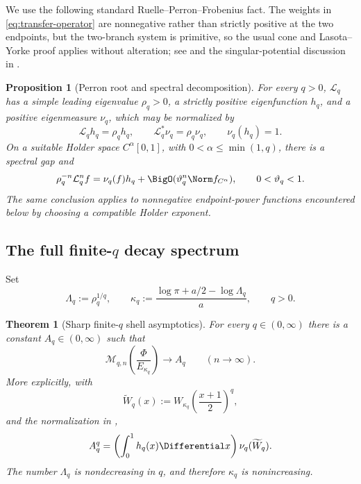 \documentclass[11pt,oneside]{article}
\newtheorem{theorem}{Theorem}[section]
\newtheorem{proposition}[proposition]{Proposition}
\theoremstyle{definition}
\theoremstyle{remark}
\newcommand{\Phiup}{\Phi}
\begin{document}
We use the following standard Ruelle--Perron--Frobenius fact.  The weights in
\eqref{eq:transfer-operator} are nonnegative rather than strictly positive at the two
endpoints, but the two-branch system is primitive, so the usual cone and
Lasota--Yorke proof applies without alteration; see \cite[Chs.~2--3]{baladi} and the
singular-potential discussion in \cite{fan1997,fan-schmeling-shen}.

\begin{proposition}[Perron root and spectral decomposition]
\label{prop:RPF}
For every $q>0$, $\mathcal L_q$ has a simple leading eigenvalue
$\rho_q>0$, a strictly positive eigenfunction $h_q$, and a positive eigenmeasure $\nu_q$,
which may be normalized by
\[
 \mathcal L_qh_q=\rho_qh_q,
 \qquad
 \mathcal L_q^*\nu_q=\rho_q\nu_q,
 \qquad
 \nu_q(h_q)=1.
\]
On a suitable Holder space $C^\alpha[0,1]$, with
$0<\alpha\le\min(1,q)$, there is a spectral gap and
\begin{equation}
 \rho_q^{-n}\mathcal L_q^nf
 =\nu_q(f)h_q+\BigO(\vartheta_q^n\Norm f_{C^\alpha}),
 \qquad 0<\vartheta_q<1.
 \label{eq:RPF-convergence}
\end{equation}
The same conclusion applies to nonnegative endpoint-power functions encountered below by
choosing a compatible Holder exponent.
\end{proposition}

\subsection{The full finite-\texorpdfstring{$q$}{q} decay spectrum}

Set
\begin{equation}
 \Lambda_q:=\rho_q^{1/q},
 \qquad
 \kappa_q:=\frac{\log\pi+a/2-\log\Lambda_q}{a},
 \qquad q>0.
 \label{eq:kappa-q}
\end{equation}

\begin{theorem}[Sharp finite-$q$ shell asymptotics]
\label{thm:Lq-spectrum}
For every $q\in(0,\infty)$ there is a constant $A_q\in(0,\infty)$ such that
\begin{equation}
 \mathcal M_{q,n}\!\left(\frac{\Phiup}{E_{\kappa_q}}\right)
 \longrightarrow A_q
 \qquad(n\to\infty).
 \label{eq:Lq-limit}
\end{equation}
More explicitly, with
\[
 \widetilde W_{q}(x)
 :=W_{\kappa_q}\!\left(\frac{x+1}{2}\right)^q,
\]
and the normalization in ,
\begin{equation}
 A_q^q=\left(\int_0^1h_q(x)\Differential x\right)\nu_q(\widetilde W_q).
 \label{eq:Aq}
\end{equation}
The number $\Lambda_q$ is nondecreasing in $q$, and therefore $\kappa_q$ is nonincreasing.
\end{theorem}
\end{document}
